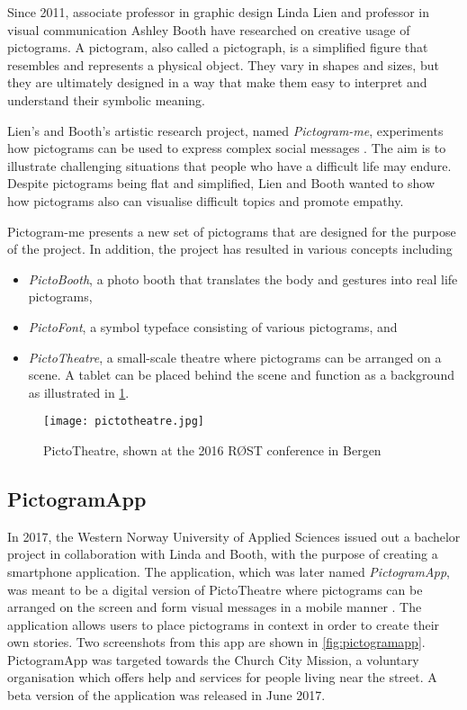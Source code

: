 Since 2011, associate professor in graphic design Linda Lien and professor in visual communication Ashley Booth have researched on creative usage of pictograms. A pictogram, also called a pictograph, is a simplified figure that resembles and represents a physical object. They vary in shapes and sizes, but they are ultimately designed in a way that make them easy to interpret and understand their symbolic meaning.

Lien's and Booth's artistic research project, named \emph{Pictogram-me}, experiments how pictograms can be used to express complex social messages \parencite{lien2018}. The aim is to illustrate challenging situations that people who have a difficult life may endure. Despite pictograms being flat and simplified, Lien and Booth wanted to show how pictograms also can visualise difficult topics and promote empathy.

Pictogram-me presents a new set of pictograms that are designed for the purpose of the project. In addition, the project has resulted in various concepts including

\begin{itemize}
    \item \emph{PictoBooth}, a photo booth that translates the body and gestures into real life pictograms,
    \item \emph{PictoFont}, a symbol typeface consisting of various pictograms, and
    \item \emph{PictoTheatre}, a small-scale theatre where pictograms can be arranged on a scene. A tablet can be placed behind the scene and function as a background as illustrated in \cref{fig:pictotheatre}.
\end{itemize}

\begin{figure}
    \centering
    \texttt{[image: pictotheatre.jpg]}
    \caption{PictoTheatre, shown at the 2016 RØST conference in Bergen}
    \label{fig:pictotheatre}
\end{figure}

\subsection{PictogramApp}

In 2017, the Western Norway University of Applied Sciences issued out a bachelor project in collaboration with Linda and Booth, with the purpose of creating a smartphone application. The application, which was later named \emph{PictogramApp}, was meant to be a digital version of PictoTheatre where pictograms can be arranged on the screen and form visual messages in a mobile manner \parencite{fure2017}. The application allows users to place pictograms in context in order to create their own stories. Two screenshots from this app are shown in \cref{fig:pictogramapp}. PictogramApp was targeted towards the Church City Mission, a voluntary organisation which offers help and services for people living near the street. A beta version of the application was released in June 2017.

